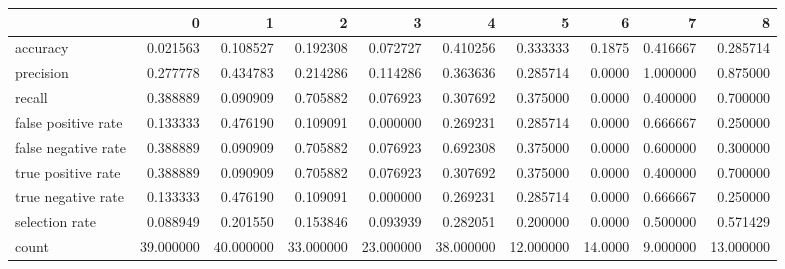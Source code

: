 \begin{tabular}{lrrrrrrrrr}
\toprule
{} &          0 &          1 &          2 &          3 &          4 &          5 &        6 &         7 &          8 \\
\midrule
accuracy            &   0.021563 &   0.108527 &   0.192308 &   0.072727 &   0.410256 &   0.333333 &   0.1875 &  0.416667 &   0.285714 \\
precision           &   0.277778 &   0.434783 &   0.214286 &   0.114286 &   0.363636 &   0.285714 &   0.0000 &  1.000000 &   0.875000 \\
recall              &   0.388889 &   0.090909 &   0.705882 &   0.076923 &   0.307692 &   0.375000 &   0.0000 &  0.400000 &   0.700000 \\
false positive rate &   0.133333 &   0.476190 &   0.109091 &   0.000000 &   0.269231 &   0.285714 &   0.0000 &  0.666667 &   0.250000 \\
false negative rate &   0.388889 &   0.090909 &   0.705882 &   0.076923 &   0.692308 &   0.375000 &   0.0000 &  0.600000 &   0.300000 \\
true positive rate  &   0.388889 &   0.090909 &   0.705882 &   0.076923 &   0.307692 &   0.375000 &   0.0000 &  0.400000 &   0.700000 \\
true negative rate  &   0.133333 &   0.476190 &   0.109091 &   0.000000 &   0.269231 &   0.285714 &   0.0000 &  0.666667 &   0.250000 \\
selection rate      &   0.088949 &   0.201550 &   0.153846 &   0.093939 &   0.282051 &   0.200000 &   0.0000 &  0.500000 &   0.571429 \\
count               &  39.000000 &  40.000000 &  33.000000 &  23.000000 &  38.000000 &  12.000000 &  14.0000 &  9.000000 &  13.000000 \\
\bottomrule
\end{tabular}
